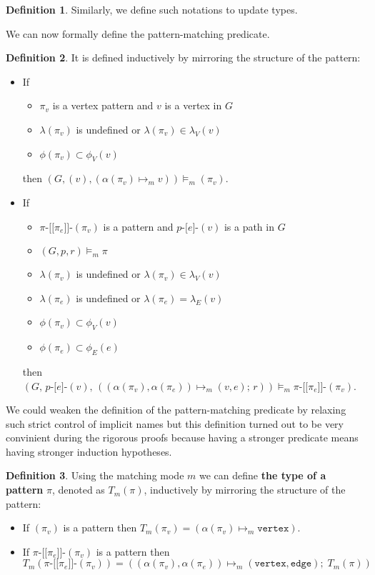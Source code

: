 \documentclass[14pt]{constructor-thesis}
\theoremstyle{definition}
\newtheorem{definition}{Definition}
\newcommand{\pathstart}[1]{(#1)}
\newcommand{\pathhop}[3]{#1 \texttt{-[} #2 \texttt{]-} (#3)}
\newcommand{\patternstart}[1]{(#1)}
\newcommand{\patternhop}[3]{#1 \texttt{-[[} #2 \texttt{]]-} (#3)}
\begin{document}
\begin{definition}
  Similarly, we define such notations to update types.
\end{definition}

We can now formally define the pattern-matching predicate.
\begin{definition}
  It is defined inductively by mirroring the structure of the pattern:
  \begin{itemize}
    \item If
      \begin{itemize}
        \item $\pi_v$ is a vertex pattern and $v$ is a vertex in $G$
        \item $\lambda (\pi_v)$ is undefined or $\lambda (\pi_v) \in \lambda_V(v)$
        \item $\phi (\pi_v) \subset \phi_V (v)$
      \end{itemize}
      then $(G, \pathstart{v}, (\alpha (\pi_v) \mapsto_m v)) \models_m \patternstart{\pi_v}$.
    \item If
      \begin{itemize}
        \item $\patternhop{\pi}{\pi_e}{\pi_v}$ is a pattern and $\pathhop{p}{e}{v}$ is a path in $G$
        \item $(G, p, r) \models_m \pi$
        \item $\lambda (\pi_v)$ is undefined or $\lambda (\pi_v) \in \lambda_V(v)$
        \item $\lambda (\pi_e)$ is undefined or $\lambda (\pi_e) = \lambda_E(v)$
        \item $\phi (\pi_v) \subset \phi_V (v)$
        \item $\phi (\pi_e) \subset \phi_E (e)$
      \end{itemize}
      then $(G, \, \pathhop{p}{e}{v}, \,((\alpha (\pi_v), \alpha (\pi_e)) \mapsto_m (v, e); \, r)) \models_m \patternhop{\pi}{\pi_e}{\pi_v}$.
  \end{itemize}
  
\end{definition}

We could weaken the definition of the pattern-matching predicate by relaxing such strict control of implicit names but this definition turned out to be very convinient during the rigorous proofs because having a stronger predicate means having stronger induction hypotheses.

\begin{definition}
  Using the matching mode $m$ we can define \textbf{the type of a pattern} $\pi$, denoted as $T_m(\pi)$, inductively by mirroring the structure of the pattern:
  \begin{itemize}
    \item If $\patternstart{\pi_v}$ is a pattern then $T_m \patternstart{\pi_v} = (\alpha (\pi_v) \mapsto_m \texttt{vertex})$.
    \item If $\patternhop{\pi}{\pi_e}{\pi_v}$ is a pattern then
    $$ T_m(\patternhop{\pi}{\pi_e}{\pi_v}) = ((\alpha (\pi_v), \alpha (\pi_e)) \mapsto_m (\texttt{vertex}, \texttt{edge}); \; T_m(\pi)) $$
  \end{itemize}
\end{definition}
\end{document}
